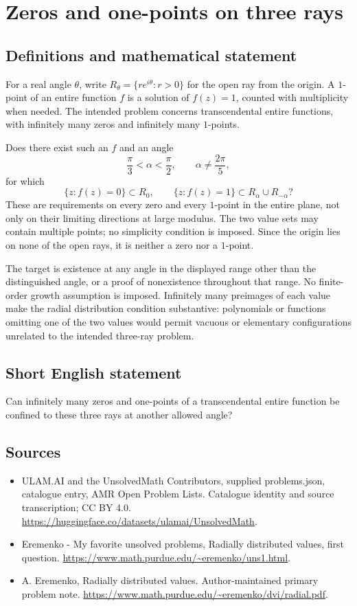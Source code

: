 \documentclass[11pt,a4paper]{article}
\begin{document}
\section*{Zeros and one-points on three rays}\label{statement}

\subsection{Definitions and mathematical statement}
For a real angle $\theta$, write
$R_\theta=\{re^{i\theta}:r>0\}$ for the open ray from
the origin. A $1$-point of an entire function $f$ is a
solution of $f(z)=1$, counted with multiplicity when needed.
The intended problem concerns transcendental entire functions,
with infinitely many zeros and infinitely many $1$-points.

Does there exist such an $f$ and an angle
\[
       \frac{\pi}{3}<\alpha<\frac{\pi}{2},
                   \qquad\alpha\ne\frac{2\pi}{5},
\]
for which
\[
 \{z:f(z)=0\}\subset R_0,\qquad
 \{z:f(z)=1\}\subset R_\alpha\cup R_{-\alpha}?
\]
These are requirements on every zero and every $1$-point
in the entire plane, not only on their limiting directions
at large modulus. The two value sets may contain multiple
points; no simplicity condition is imposed. Since the
origin lies on none of the open rays, it is neither a
zero nor a $1$-point.

The target is existence at any angle in the displayed
range other than the distinguished angle, or a proof of
nonexistence throughout that range. No finite-order growth
assumption is imposed. Infinitely many preimages of each
value make the radial distribution condition substantive:
polynomials or functions omitting one of the two values
would permit vacuous or elementary configurations unrelated
to the intended three-ray problem.
\subsection{Short English statement}
Can infinitely many zeros and one-points of a transcendental entire function be confined to these three rays at another allowed angle?
\subsection{Sources}
\begin{itemize}
\item[S1] ULAM.AI and the UnsolvedMath Contributors, supplied problems.json, catalogue entry, AMR Open Problem Lists. Catalogue identity and source transcription; CC BY 4.0.
\url{https://huggingface.co/datasets/ulamai/UnsolvedMath}.
\item[S2] Eremenko - My favorite unsolved problems, Radially distributed values, first question. 
\url{https://www.math.purdue.edu/~eremenko/uns1.html}.
\item[S3] A. Eremenko, Radially distributed values. Author-maintained primary problem note.
\url{https://www.math.purdue.edu/~eremenko/dvi/radial.pdf}.
\end{itemize}
\end{document}
